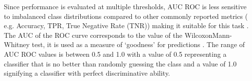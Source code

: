 Since performance is evaluated at multiple thresholds, AUC ROC is less sensitive to imbalanced class distributions compared to other commonly reported metrics ( e.g. Accuracy, TPR, True Negative Rate (TNR)) making it suitable for this task \cite{bradley1997use}.
The AUC of the ROC curve corresponds to the value of the WilcoxonMann-Whitney test, it is used as a measure of `goodness' for predictions \cite{vihinen2012evaluate}. The range of AUC ROC values is between 0.5 and 1.0 with a value of 0.5 representing a classifier that is no better than randomly guessing the class and a value of 1.0 signifying a classifier with perfect discriminative ability.

